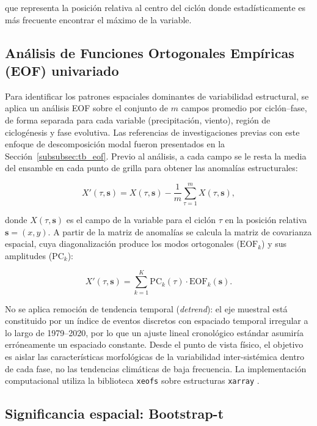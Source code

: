 que representa la posición relativa al centro del ciclón donde estadísticamente es más frecuente encontrar el máximo de la variable.

\subsection{Análisis de Funciones Ortogonales Empíricas (EOF) univariado}\label{subsec:eof_univariado}

Para identificar los patrones espaciales dominantes de variabilidad estructural, se aplica un análisis EOF sobre el conjunto de $m$ campos promedio por ciclón--fase, de forma separada para cada variable (precipitación, viento), región de ciclogénesis y fase evolutiva. Las referencias de investigaciones previas con este enfoque de descomposición modal fueron presentados en la Sección~\ref{subsubsec:tb_eof}. Previo al análisis, a cada campo se le resta la media del ensamble en cada punto de grilla para obtener las anomalías estructurales:

\begin{equation}
    X'(\tau, \mathbf{s}) = X(\tau, \mathbf{s}) - \frac{1}{m}\sum_{\tau=1}^{m}X(\tau, \mathbf{s}),
\end{equation}

donde $X(\tau, \mathbf{s})$ es el campo de la variable para el ciclón $\tau$ en la posición relativa $\mathbf{s} = (x,y)$. A partir de la matriz de anomalías se calcula la matriz de covarianza espacial, cuya diagonalización produce los modos ortogonales ($\text{EOF}_k$) y sus amplitudes ($\text{PC}_k$):

\begin{equation}
    X'(\tau, \mathbf{s}) = \sum_{k=1}^{K} \text{PC}_k(\tau) \cdot \text{EOF}_k(\mathbf{s}).
\end{equation}

No se aplica remoción de tendencia temporal (\textit{detrend}): el eje muestral está constituido por un índice de eventos discretos con espaciado temporal irregular a lo largo de 1979--2020, por lo que un ajuste lineal cronológico estándar asumiría erróneamente un espaciado constante. Desde el punto de vista físico, el objetivo es aislar las características morfológicas de la variabilidad inter-sistémica dentro de cada fase, no las tendencias climáticas de baja frecuencia. La implementación computacional utiliza la biblioteca \texttt{xeofs} \citep{rieger2024xeofs} sobre estructuras \texttt{xarray} \citep{hoyer2017xarray}.

\subsection{Significancia espacial: Bootstrap-t}\label{subsec:bootstrap_significancia}

